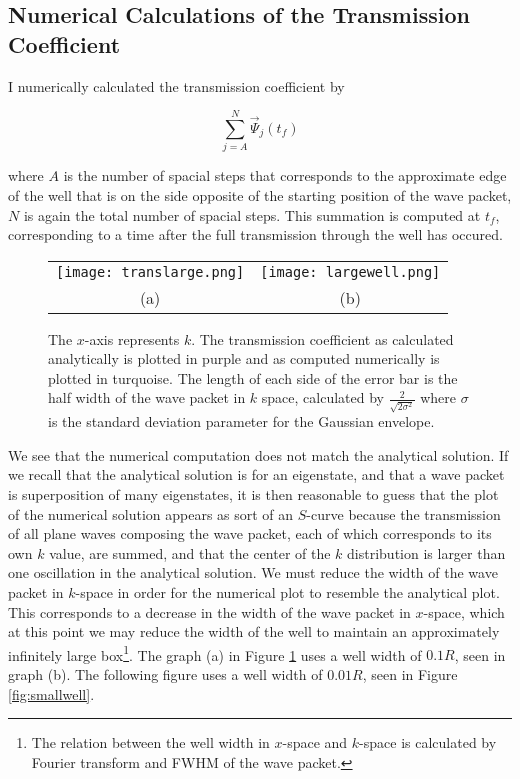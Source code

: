 \subsection*{Numerical Calculations of the Transmission Coefficient}
\label{subsec:num}

I numerically calculated the transmission coefficient by

\[
    \sum_{j = A}^N \vec{\Psi}_j(t_f)
\]

where $A$ is the number of spacial steps that corresponds to the approximate
edge of the well that is on the side opposite of the starting position of
the wave packet, $N$ is again the total number of spacial steps. This
summation is computed at $t_f$, corresponding to a time after the full
transmission through the well has occured.

\begin{figure}[H]
    \centering
    \begin{tabular}{cc}
        \texttt{[image: translarge.png]}
        &
        \texttt{[image: largewell.png]}
        \\
        (a) & (b)
    \end{tabular}
    \caption[Large Well Transmission]{The $x$-axis represents $k$. The
    transmission coefficient as calculated analytically is plotted in purple
    and as computed numerically is plotted in turquoise. The length of each
    side of the error bar is the half width of the wave packet in $k$ space,
    calculated by $\frac{2}{\sqrt{2\sigma^2}}$ where $\sigma$ is the
    standard deviation parameter for the Gaussian envelope.}
    \label{translarge}
\end{figure}

We see that the numerical computation does not match the analytical solution.
If we recall that the analytical solution is for an eigenstate, and that a
wave packet is superposition of many eigenstates, it is then reasonable to
guess that the plot of the numerical solution appears as sort of an
$S$-curve because the transmission of all plane waves composing the wave
packet, each of which corresponds to its own $k$ value, are summed, and that
the center of the $k$ distribution is larger than one oscillation in the
analytical solution. We must reduce the width of the wave packet in
$k$-space in order for the numerical plot to resemble the analytical plot.
This corresponds to a decrease in the width of the wave packet in $x$-space,
which at this point we may reduce the width of the well to maintain an
approximately infinitely large box\footnote[1]{The relation between the well
width in $x$-space and $k$-space is calculated by Fourier transform and
FWHM of the wave packet.}. The graph (a) in Figure \ref{translarge} uses a
well width of $0.1R$, seen in graph (b). The following figure uses a well
width of $0.01R$, seen in Figure \ref{fig:smallwell}.


